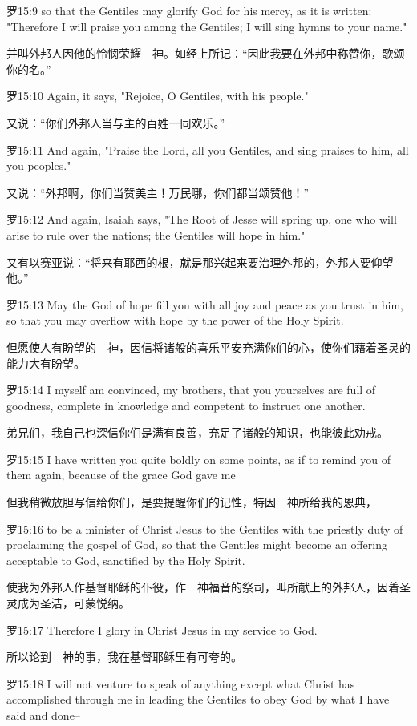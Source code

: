 \documentclass[a4paper,11pt,onecolumn,twoside]{ctexart}
\begin{document}
\begin{multicols}{2}
 罗15:9
 so that the Gentiles may glorify God for his mercy, as it is written: "Therefore I will praise you among the Gentiles; I will sing hymns to your name."

 并叫外邦人因他的怜悯荣耀　神。如经上所记：“因此我要在外邦中称赞你，歌颂你的名。”


 罗15:10
 Again, it says, "Rejoice, O Gentiles, with his people."

 又说：“你们外邦人当与主的百姓一同欢乐。”


 罗15:11
 And again, "Praise the Lord, all you Gentiles, and sing praises to him, all you peoples."

 又说：“外邦啊，你们当赞美主！万民哪，你们都当颂赞他！”


 罗15:12
 And again, Isaiah says, "The Root of Jesse will spring up, one who will arise to rule over the nations; the Gentiles will hope in him."

 又有以赛亚说：“将来有耶西的根，就是那兴起来要治理外邦的，外邦人要仰望他。”


 罗15:13
 May the God of hope fill you with all joy and peace as you trust in him, so that you may overflow with hope by the power of the Holy Spirit.

 但愿使人有盼望的　神，因信将诸般的喜乐平安充满你们的心，使你们藉着圣灵的能力大有盼望。


 罗15:14
 I myself am convinced, my brothers, that you yourselves are full of goodness, complete in knowledge and competent to instruct one another.

 弟兄们，我自己也深信你们是满有良善，充足了诸般的知识，也能彼此劝戒。


 罗15:15
 I have written you quite boldly on some points, as if to remind you of them again, because of the grace God gave me

 但我稍微放胆写信给你们，是要提醒你们的记性，特因　神所给我的恩典，


 罗15:16
 to be a minister of Christ Jesus to the Gentiles with the priestly duty of proclaiming the gospel of God, so that the Gentiles might become an offering acceptable to God, sanctified by the Holy Spirit.

 使我为外邦人作基督耶稣的仆役，作　神福音的祭司，叫所献上的外邦人，因着圣灵成为圣洁，可蒙悦纳。


 罗15:17
 Therefore I glory in Christ Jesus in my service to God.

 所以论到　神的事，我在基督耶稣里有可夸的。


 罗15:18
 I will not venture to speak of anything except what Christ has accomplished through me in leading the Gentiles to obey God by what I have said and done--


\end{multicols}
\end{document}

